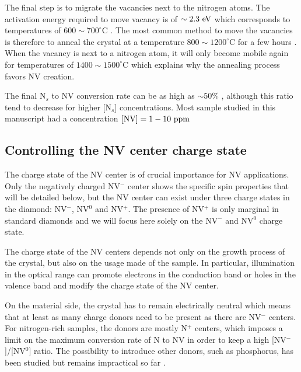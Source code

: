 \documentclass[a4paper,11pt]{report}
\begin{document}
The final step is to migrate the vacancies next to the nitrogen atoms. The activation energy required to move vacancy is of $\sim 2.3\ \rm eV$ which corresponds to temperatures of $600\sim 700 ^\circ$C \citep{davies1992vacancy, newton2002recombination}. The most common method to move the vacancies is therefore to anneal the crystal at a temperature $800 \sim 1200 ^\circ$C for a few hours \citep{botsoa2011optimal}. When the vacancy is next to a nitrogen atom, it will only become mobile again for temperatures of $1400 \sim 1500 ^\circ$C \citep{zaitsev2013optical, pinto2012diffusion} which explains why the annealing process favors NV creation.

The final N$_s$ to NV conversion rate can be as high as $\sim 50 \%$ \citep{grezes2015storage, hartland2014study}, although this ratio tend to decrease for higher [N$_s$] concentrations. Most sample studied in this manuscript had a concentration $[\rm NV]= 1-10\ \rm ppm$

\subsection{Controlling the NV center charge state}

The charge state of the NV center is of crucial importance for NV applications. Only the negatively charged NV$^-$ center shows the specific spin properties that will be detailed below, but the NV center can exist under three charge states in the diamond: NV$^-$, NV$^0$ and NV$^+$. The presence of NV$^+$ is only marginal in standard diamonds \citep{hauf2014addressing, pfender2017protecting} and we will focus here solely on the NV$^-$ and NV$^0$ charge state.

The charge state of the NV centers depends not only on the growth process of the crystal, but also on the usage made of the sample. In particular, illumination in the optical range can promote electrons in the conduction band or holes in the valence band and modify the charge state of the NV center.

On the material side, the crystal has to remain electrically neutral which means that at least as many charge donors need to be present as there are NV$^-$ centers. For nitrogen-rich samples, the donors are mostly N$^+$ centers, which imposes a limit on the maximum conversion rate of N to NV in order to keep a high [NV$^-$]/[NV$^0$] ratio. The possibility to introduce other donors, such as phosphorus, has been studied \citep{doi2016pure} but remains impractical so far \citep{barry2020sensitivity}.
\end{document}
